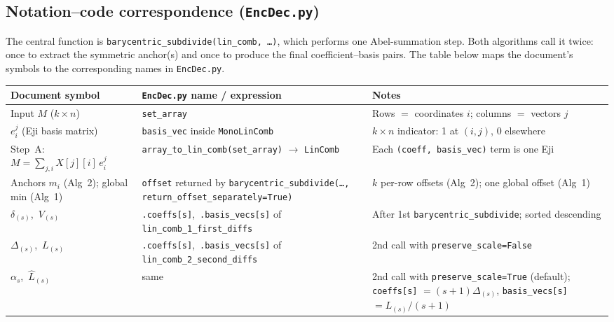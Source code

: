 \documentclass[11pt,a4paper]{article}
\newcommand{\encdecpy}{\texttt{EncDec.py}}
\newcommand{\eji}[2]{e^{#1}_{#2}}       %
\begin{document}
\subsection*{Notation--code correspondence (\encdecpy)}

The central function is \texttt{barycentric\_subdivide(lin\_comb, \ldots)}, which
performs one Abel-summation step.  Both algorithms call it twice: once to extract
the symmetric anchor(s) and once to produce the final coefficient--basis pairs.
The table below maps the document's symbols to the corresponding names in
\encdecpy.

\begin{center}
\small
\setlength{\tabcolsep}{5pt}
\renewcommand{\arraystretch}{1.35}
\begin{tabular}{p{3.4cm} p{6cm} p{4.8cm}}
\toprule
\textbf{Document symbol} & \textbf{\encdecpy{} name / expression} & \textbf{Notes} \\
\midrule
Input $M$ ($k{\times}n$) &
  \texttt{set\_array} &
  Rows $= $ coordinates $i$; columns $= $ vectors $j$ \\[3pt]

$\eji{j}{i}$ (Eji basis matrix) &
  \texttt{basis\_vec} inside \texttt{MonoLinComb} &
  $k{\times}n$ indicator: 1 at $(i,j)$, 0 elsewhere \\[3pt]

Step~A: $M = \sum_{j,i} X[j][i]\,\eji{j}{i}$ &
  \texttt{array\_to\_lin\_comb(set\_array)} $\to$ \texttt{LinComb} &
  Each \texttt{(coeff, basis\_vec)} term is one Eji \\[3pt]

Anchors $m_i$ (Alg~2); global min (Alg~1) &
  \texttt{offset} returned by \texttt{barycentric\_subdivide(\ldots,}
  \texttt{return\_offset\_separately=True)} &
  $k$ per-row offsets (Alg~2); one global offset (Alg~1) \\[3pt]

$\delta_{(s)}$,\ $V_{(s)}$ &
  \texttt{.coeffs[s]},\ \texttt{.basis\_vecs[s]} of
  \texttt{lin\_comb\_1\_first\_diffs} &
  After 1st \texttt{barycentric\_subdivide}; sorted descending \\[3pt]

$\Delta_{(s)}$,\ $L_{(s)}$ &
  \texttt{.coeffs[s]},\ \texttt{.basis\_vecs[s]} of
  \texttt{lin\_comb\_2\_second\_diffs} &
  2nd call with \texttt{preserve\_scale=False} \\[3pt]

$\alpha_s$,\ $\hat{L}_{(s)}$ &
  same &
  2nd call with \texttt{preserve\_scale=True} (default);
  \texttt{coeffs[s]} $=(s{+}1)\Delta_{(s)}$,
  \texttt{basis\_vecs[s]} $=L_{(s)}/(s{+}1)$ \\[3pt]


\end{tabular}
\end{center}
\end{document}
